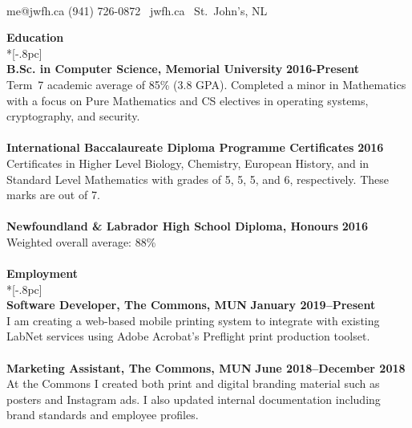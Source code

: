 \documentclass[letterpaper]{article}
\let\dateshape\bf
\begin{document}
\vspace*{-2.75pc}
\begin{center}
	\scalebox{1.2}{\Huge Jacob W.F. House} \\[.75pc]
	{\Large{}} me@jwfh.ca \quad 
	{\Large{}} (941) 726-0872 \quad
	\faLaptop\ jwfh.ca \quad
	\faHome\ St.~John's, NL
	\\[2pc]
\end{center}

{\large \bf Education} \\*[-.8pc]
\underline{\hspace{\textwidth}} \\[0.5pc]
{\bf B.Sc. in Computer Science, Memorial University} \hfill {\dateshape 2016-Present} \\
Term~7 academic average of 85\% (3.8 GPA). Completed a minor in Mathematics with a focus on Pure Mathematics and CS electives in operating systems, cryptography, and security. \\
\\
{\bf International Baccalaureate Diploma Programme Certificates} \hfill {\dateshape 2016} \\
Certificates in Higher Level Biology, Chemistry, European History, and in Standard 
Level Mathematics with grades of 5, 5, 5, and 6, respectively. These marks are out of 7. \\
\\
{\bf Newfoundland \& Labrador High School Diploma, Honours} \hfill {\dateshape 2016} \\
Weighted overall average: 88\% \\
\\[0.5pc]
{\large \bf Employment} \\*[-.8pc]
\underline{\hspace{\textwidth}} \\[0.5pc]
{\bf Software Developer, The Commons, MUN } \hfill {\dateshape January 2019--Present\/} \\
I am creating a web-based mobile printing system to integrate with existing LabNet
services using Adobe Acrobat's Preflight print production toolset. \\
\\
{\bf Marketing Assistant, The Commons, MUN } \hfill {\dateshape June 2018--December 2018\/} \\
At the Commons I created both print and digital branding material such as posters and Instagram 
ads. I also updated internal documentation including brand standards and employee profiles. \\
\end{document}
